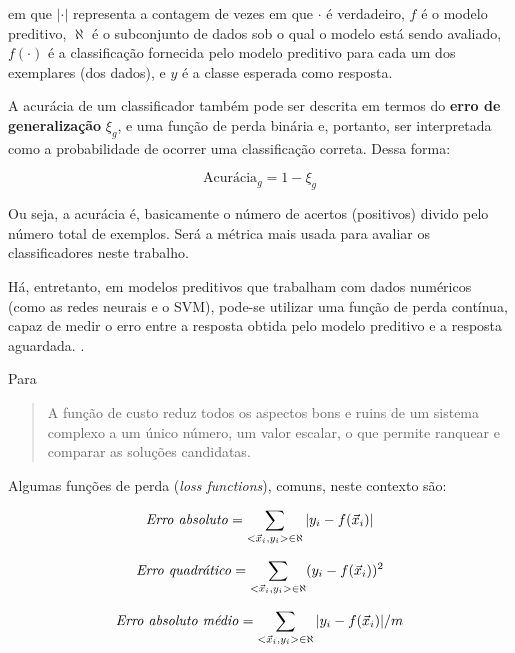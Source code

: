 em que $|\cdot|$ representa a contagem de vezes em que $\cdot$ é verdadeiro, $f$ é o modelo preditivo, $\aleph$ é o subconjunto de dados sob o qual o modelo está sendo avaliado, $f(\cdot)$ é a classificação fornecida pelo modelo preditivo para cada um dos exemplares (dos dados), e $y$ é a classe esperada como resposta. \cite[p. 129]{Boscarioli2017}

A acurácia de um classificador também pode ser descrita em termos do \textbf{erro de generalização} $\xi_g$, e uma função de perda binária e, portanto, ser interpretada como a probabilidade de ocorrer uma classificação correta. Dessa forma:

\begin{equation}
\text{Acurácia}_g=1 - \xi_g
\end{equation}

Ou seja, a acurácia é, basicamente o número de acertos (positivos) divido pelo número total de exemplos. Será a métrica mais usada para avaliar os classificadores neste trabalho.

Há, entretanto, em modelos preditivos que trabalham com dados numéricos (como as redes neurais e o SVM), pode-se utilizar uma função de perda contínua, capaz de medir o erro entre a resposta obtida pelo modelo preditivo e a resposta aguardada. \cite{Boscarioli2017} \cite{deep_learning_book_2019}.

Para \cite{nn_smithing_1999}
\begin{quote}
	A função de custo reduz todos os aspectos bons e ruins de um sistema complexo a um único número, um valor escalar, o que permite ranquear e comparar as soluções candidatas.
\end{quote}

Algumas funções de perda (\textit{loss functions}), comuns, neste contexto são: \cite{Boscarioli2017}

\begin{equation}\label{erro_absoluto}
	\text{\textit{Erro absoluto}}=\sum_{<\vec{x}_i, y_i> \in \aleph} |y_i - f(\vec{x}_i)|
\end{equation}

\begin{equation}\label{erro_quadratico}
\text{\textit{Erro quadrático}}=\sum_{<\vec{x}_i, y_i> \in \aleph} (y_i - f(\vec{x}_i))^2
\end{equation}

\begin{equation}\label{erro_absoluto_medio}
\text{\textit{Erro absoluto médio}}=\sum_{<\vec{x}_i, y_i> \in \aleph} |y_i - f(\vec{x}_i)|/m
\end{equation}

